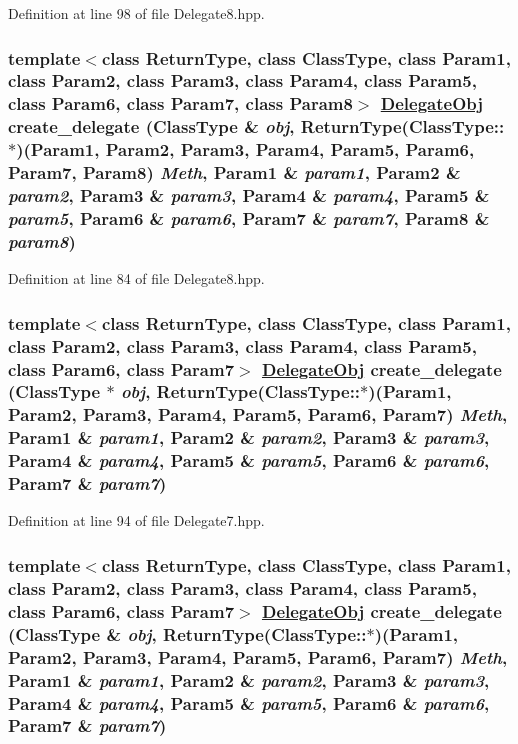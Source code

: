Definition at line 98 of file Delegate8.hpp.\hypertarget{namespaceDL_a19}{
\subsubsection[create\_\-delegate]{\setlength{\rightskip}{0pt plus 5cm}template$<$class Return\-Type, class Class\-Type, class Param1, class Param2, class Param3, class Param4, class Param5, class Param6, class Param7, class Param8$>$ \hyperlink{namespaceDL_a0}{Delegate\-Obj} create\_\-delegate (Class\-Type \& {\em obj}, Return\-Type(Class\-Type::$\ast$)(Param1, Param2, Param3, Param4, Param5, Param6, Param7, Param8) {\em Meth}, Param1 \& {\em param1}, Param2 \& {\em param2}, Param3 \& {\em param3}, Param4 \& {\em param4}, Param5 \& {\em param5}, Param6 \& {\em param6}, Param7 \& {\em param7}, Param8 \& {\em param8})}}
\label{namespaceDL_a19}




Definition at line 84 of file Delegate8.hpp.\hypertarget{namespaceDL_a18}{
\subsubsection[create\_\-delegate]{\setlength{\rightskip}{0pt plus 5cm}template$<$class Return\-Type, class Class\-Type, class Param1, class Param2, class Param3, class Param4, class Param5, class Param6, class Param7$>$ \hyperlink{namespaceDL_a0}{Delegate\-Obj} create\_\-delegate (Class\-Type $\ast$ {\em obj}, Return\-Type(Class\-Type::$\ast$)(Param1, Param2, Param3, Param4, Param5, Param6, Param7) {\em Meth}, Param1 \& {\em param1}, Param2 \& {\em param2}, Param3 \& {\em param3}, Param4 \& {\em param4}, Param5 \& {\em param5}, Param6 \& {\em param6}, Param7 \& {\em param7})}}
\label{namespaceDL_a18}




Definition at line 94 of file Delegate7.hpp.\hypertarget{namespaceDL_a17}{
\subsubsection[create\_\-delegate]{\setlength{\rightskip}{0pt plus 5cm}template$<$class Return\-Type, class Class\-Type, class Param1, class Param2, class Param3, class Param4, class Param5, class Param6, class Param7$>$ \hyperlink{namespaceDL_a0}{Delegate\-Obj} create\_\-delegate (Class\-Type \& {\em obj}, Return\-Type(Class\-Type::$\ast$)(Param1, Param2, Param3, Param4, Param5, Param6, Param7) {\em Meth}, Param1 \& {\em param1}, Param2 \& {\em param2}, Param3 \& {\em param3}, Param4 \& {\em param4}, Param5 \& {\em param5}, Param6 \& {\em param6}, Param7 \& {\em param7})}}
\label{namespaceDL_a17}




